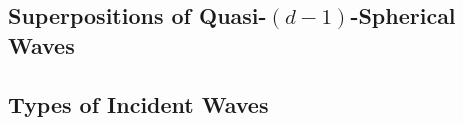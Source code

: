 \subsection{Superpositions of Quasi-$(d-1)$-Spherical Waves}
\label{subsec:syn_p_in_sup_qsw}


\subsection{Types of Incident Waves}
\label{subsec:syn_p_in_types}

